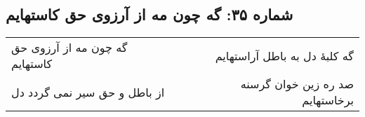 \begin{center}
\section*{شماره ۳۵: گه چون مه از آرزوی حق کاستهایم}
\label{sec:035}
\begin{longtable}{l p{0.5cm} r}
گه چون مه از آرزوی حق کاستهایم
&&
گه کلبهٔ‌ دل به باطل آراستهایم
\\
از باطل و حق سیر نمی گردد دل
&&
صد ره زین خوان گرسنه برخاستهایم
\\
\end{longtable}
\end{center}
